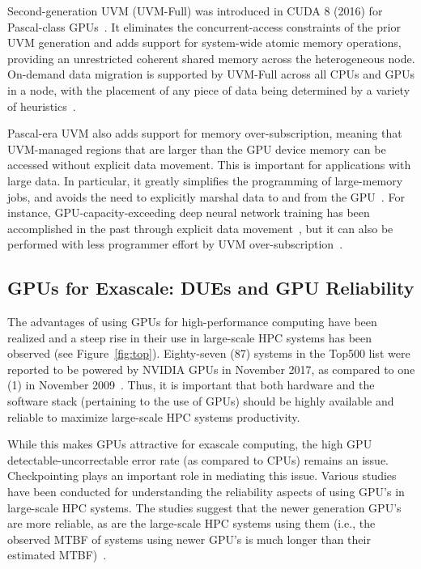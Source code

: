 \documentclass[11pt]{article}
\begin{document}
Second-generation UVM (UVM-Full) was introduced in CUDA 8 (2016) for
Pascal-class GPUs~\cite{harris_2016}. It eliminates the concurrent-access
constraints of the prior UVM generation and adds support for system-wide atomic
memory operations, providing an unrestricted coherent shared memory across the
heterogeneous node. On-demand data migration is supported by UVM-Full across
all CPUs and GPUs in a node, with the placement of any piece of data being
determined by a variety of heuristics~\cite{harris_2017}.

Pascal-era UVM also
adds support for memory over-subscription, meaning that UVM-managed regions
that are larger than the GPU device memory can be accessed without explicit
data movement.  This is important for applications with large data.
In particular, it greatly simplifies the programming of large-memory jobs,
and avoids the need to explicitly marshal data to and from the
GPU~\cite{sakharnykh_amrproxy_2016}. For instance, GPU-capacity-exceeding deep
neural network training has been accomplished in the past through explicit data
movement~\cite{rhu_vdnn:_2016}, but it can also be performed with less
programmer effort by UVM over-subscription~\cite{sakharnykh_gtc_2017}.





\subsection{GPUs for Exascale: DUEs and GPU Reliability}
\label{sec:motivateReliability}

The advantages of using GPUs for high-performance computing have been realized and a steep rise in their use in large-scale HPC systems has been observed (see Figure~\ref{fig:top}). Eighty-seven (87) systems in the Top500 list were reported to be powered by NVIDIA GPUs in November 2017, as compared to one (1) in November 2009~\cite{top500-2017}. Thus, it is important that both hardware and the software stack (pertaining to the use of GPUs) should be highly available and reliable to maximize large-scale HPC systems productivity.

While this makes GPUs attractive for exascale computing, the high GPU detectable-uncorrectable error rate (as compared to CPUs) remains an issue.  Checkpointing
plays an important role in mediating this issue.
Various studies have been conducted for understanding the reliability aspects of using GPU's in large-scale HPC systems.
The studies suggest that the newer generation GPU's are more reliable, as are the large-scale HPC systems using them (i.e., the observed MTBF of systems using newer GPU's is much longer than their estimated MTBF)~\cite{haque2010hard,shi2011sustainable,debardeleben2014gpu,tiwari2015reliability,tiwari2015understanding,sridharan2015memory}.
\end{document}
